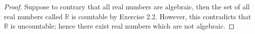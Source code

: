 \begin{Exercise}
\begin{proof}
Suppose to contrary that all real numbers are algebraic, then the set of all real numbers called $\mathbb{R}$ is countable by Exercise 2.2. However, this contradicts that $\mathbb{R}$ is uncountable; hence there exist real numbers which are not algebraic.
\end{proof}
\end{Exercise}